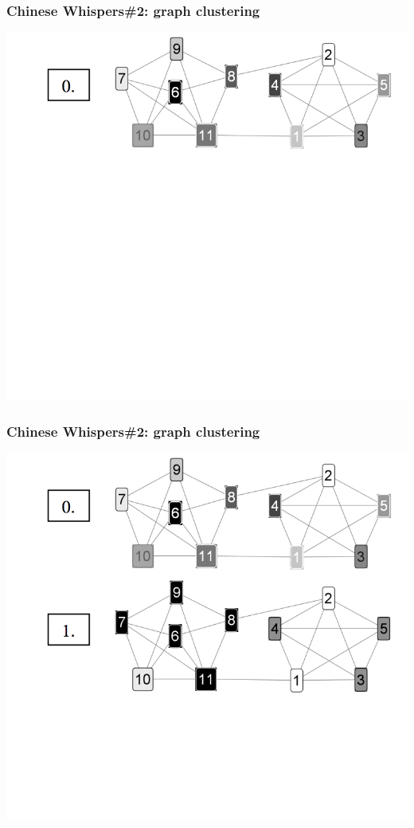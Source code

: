 \documentclass[usenames,dvipsnames]{beamer}
\begin{document}
\begin{frame}[fragile]
\frametitle{Chinese Whispers\#2: \alert{graph clustering}}
\begin{center}
 \includegraphics[height=0.59\textwidth]{figures/cw2-1}
 
 \end{center}
\end{frame}


\begin{frame}[fragile]
\frametitle{Chinese Whispers\#2: \alert{graph clustering}}
\begin{center}
 \includegraphics[height=0.59\textwidth]{figures/cw2-2}
 
 \end{center}
\end{frame}
\end{document}
